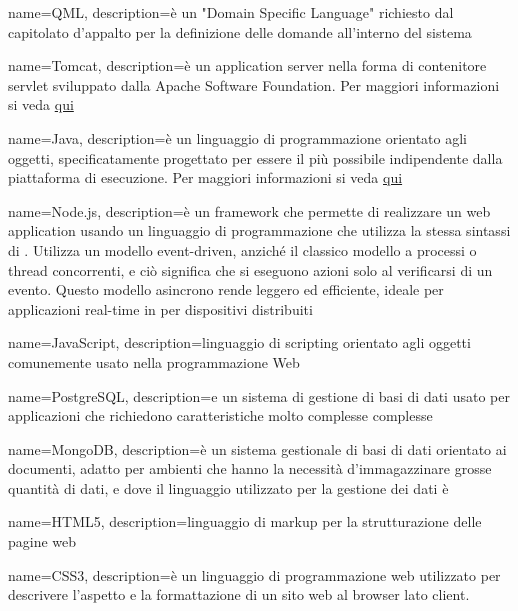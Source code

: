  {
	name=QML,
	description={è un "Domain Specific Language" richiesto dal capitolato d'appalto per la definizione delle domande all'interno del sistema}
}

 {
	name=Tomcat,
	description={è un application server nella forma di contenitore servlet  sviluppato dalla Apache Software Foundation. Per maggiori informazioni si veda \href{https://it.wikipedia.org/wiki/Apache_Tomcat}{qui}}
}






 {
	name=Java,
	description={è un linguaggio di programmazione orientato agli oggetti, specificatamente progettato per essere il più possibile indipendente dalla piattaforma di esecuzione. Per maggiori informazioni si veda \href{https://it.wikipedia.org/wiki/Java_(linguaggio_di_programmazione)}{qui}}
}

 {
	name=Node.js,
	description={è un framework che permette di realizzare un web application usando un linguaggio di programmazione che utilizza la stessa sintassi di . Utilizza un modello event-driven, anziché il classico modello a processi o thread concorrenti, e ciò significa che si eseguono azioni solo al verificarsi di un evento. Questo modello asincrono rende leggero ed efficiente, ideale per applicazioni real-time in per dispositivi distribuiti}
}

 {
	name=JavaScript,
	description={linguaggio di scripting orientato agli oggetti comunemente usato nella programmazione
Web}
}

 {
	name=PostgreSQL,
	description={e un sistema di gestione di basi di dati  usato per applicazioni che richiedono caratteristiche molto complesse complesse}
}

 {
	name=MongoDB,
	description={è un sistema gestionale di basi di dati  orientato ai documenti, adatto per ambienti che hanno la necessità d'immagazzinare grosse quantità di dati, e dove il linguaggio utilizzato per la gestione dei dati è }
}

 {
	name=HTML5,
	description={linguaggio di markup per la strutturazione delle pagine web}
}

 {
	name=CSS3,
	description={è un linguaggio di programmazione web utilizzato per descrivere l'aspetto e la formattazione di un sito web al browser lato client. }
}

